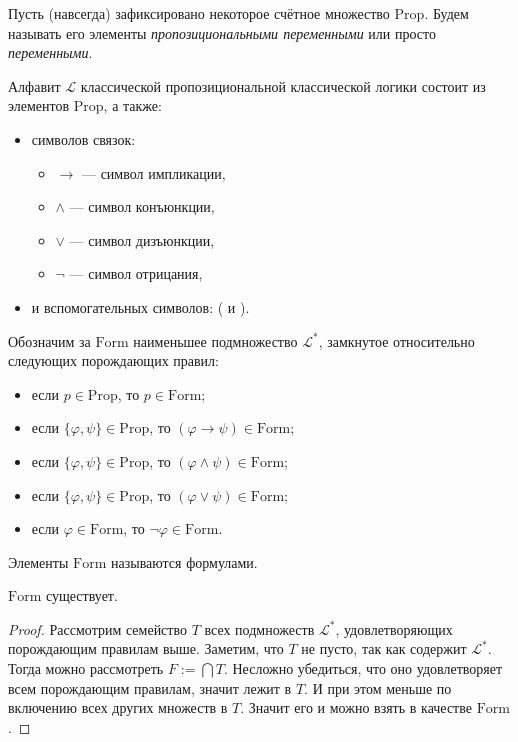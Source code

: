 \documentclass[12pt,a4paper]{article}
\newcommand{\Prop}{\ensuremath{\mathrm{Prop}}\xspace}
\newcommand{\Formul}{\ensuremath{\mathrm{Form}}\xspace}
\begin{document}
    \begin{definition}
        Пусть (навсегда) зафиксировано некоторое счётное множество \Prop. Будем называть его элементы \emph{пропозициональными переменными} или просто \emph{переменными}.

        Алфавит $\mathscr{L}$ классической пропозициональной классической логики состоит из элементов \Prop, а также:
        \begin{itemize}
            \item символов связок:
                \begin{itemize}
                    \item $\rightarrow$ --- символ импликации,
                    \item $\wedge$ --- символ конъюнкции,
                    \item $\vee$ --- символ дизъюнкции,
                    \item $\neg$ --- символ отрицания,
                \end{itemize}
            \item и вспомогательных символов: ( и ).
        \end{itemize}

        Обозначим за \Formul наименьшее подмножество $\mathscr{L}^*$, замкнутое относительно следующих порождающих правил:
        \begin{itemize}
            \item если $p \in \Prop$, то $p \in \Formul$;
            \item если $\{\varphi, \psi\} \in \Prop$, то $(\varphi \rightarrow \psi) \in \Formul$;
            \item если $\{\varphi, \psi\} \in \Prop$, то $(\varphi \wedge \psi) \in \Formul$;
            \item если $\{\varphi, \psi\} \in \Prop$, то $(\varphi \vee \psi) \in \Formul$;
            \item если $\varphi \in \Formul$, то $\neg \varphi \in \Formul$.
        \end{itemize}
        Элементы \Formul называются формулами.
    \end{definition}

    \begin{theorem}
        \Formul существует.
    \end{theorem}

    \begin{proof}
        Рассмотрим семейство $T$ всех подмножеств $\mathscr{L}^*$, удовлетворяющих порождающим правилам выше. Заметим, что $T$ не пусто, так как содержит $\mathscr{L}^*$. Тогда можно рассмотреть $F := \bigcap T$. Несложно убедиться, что оно удовлетворяет всем порождающим правилам, значит лежит в $T$. И при этом меньше по включению всех других множеств в $T$. Значит его и можно взять в качестве $\Formul$.
    \end{proof}
\end{document}
